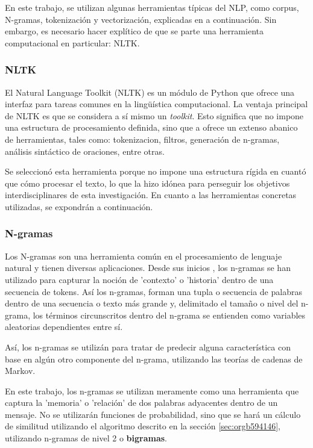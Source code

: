 \documentclass[12pt,letterpaper,twoside]{article}
\begin{document}
En este trabajo, se utilizan algunas herramientas típicas del
NLP, como corpus, N-gramas, tokenización y vectorización, explicadas
en a continuación. Sin embargo, es necesario hacer explítico de
que se parte una herramienta computacional en particular: NLTK.

\subsubsection{NLTK}
\label{sec:org508e6e8}
El Natural Language Toolkit (NLTK) es un módulo de Python que ofrece
una interfaz para tareas comunes en la lingüística computacional. La
ventaja principal de NLTK es que se considera a sí mismo un
\emph{toolkit}. Esto significa que no impone una estructura de
procesamiento definida, sino que a ofrece un extenso abanico de
herramientas, tales como: tokenizacion, filtros, generación de
n-gramas, análisis sintáctico de oraciones, entre otras.

Se seleccionó esta herramienta porque no impone una estructura
rígida en cuantó que cómo procesar el texto, lo que la hizo
idónea para perseguir los objetivos interdisciplinares de esta
investigación. En cuanto a las herramientas concretas utilizadas,
se expondrán a continuación.

\subsubsection{N-gramas}
\label{sec:orgb56f073}

Los N-gramas son una herramienta común en el procesamiento
de lenguaje natural y tienen diversas aplicaciones. Desde sus
inicios \cite{manning1999foundations}, los n-gramas se han
utilizado para capturar la noción de 'contexto' o 'historia'
dentro de una secuencia de tokens. Así los n-gramas, forman
una tupla o secuencia de palabras dentro de una secuencia
o texto más grande y, delimitado el tamaño o nivel del
n-grama, los términos circunscritos dentro del n-grama
se entienden como variables aleatorias dependientes entre sí.

Así, los n-gramas se utilizán para tratar de predecir alguna
característica con base en algún otro componente del n-grama,
utilizando las teorías de cadenas de Markov.

En este trabajo, los n-gramas se utilizan meramente
como una herramienta que captura la 'memoria' o 'relación'
de dos palabras adyacentes dentro de un mensaje. No se
utilizarán funciones de probabilidad, sino que se hará
un cálculo de similitud utilizando el algoritmo descrito
en la sección  \ref{sec:orgb594146}, utilizando
n-gramas de nivel 2 o \textbf{bigramas}.
\end{document}
